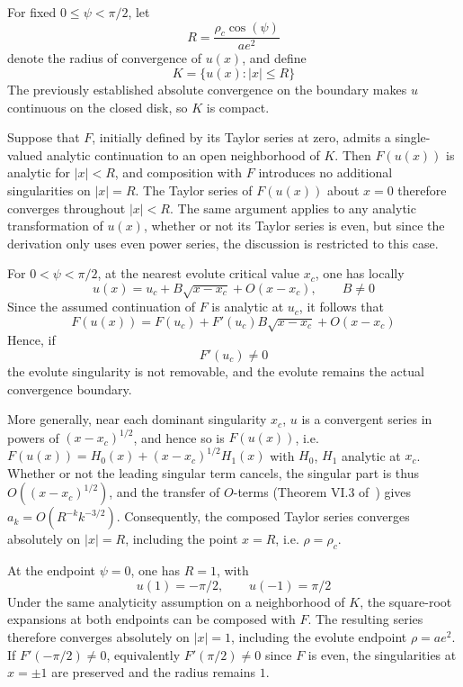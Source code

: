 \documentclass[a4paper]{amsart}
\begin{document}
For fixed $0\leq\psi<\pi/2$, let
\begin{equation*}
R=\frac{\rho_c\cos(\psi)}{ae^2}
\end{equation*}
denote the radius of convergence of $u(x)$, and define
\begin{equation*}
K=\{u(x):|x|\leq R\}
\end{equation*}
The previously established absolute convergence on the boundary makes $u$ continuous on the closed disk, so $K$ is compact.

Suppose that $F$, initially defined by its Taylor series at zero, admits a single-valued analytic continuation to an open neighborhood of $K$. Then $F(u(x))$ is analytic for $|x|<R$, and composition with $F$ introduces no additional singularities on $|x|=R$. The Taylor series of $F(u(x))$ about $x=0$ therefore converges throughout $|x|<R$. The same argument applies to any analytic transformation of $u(x)$, whether or not its Taylor series is even, but since the derivation only uses even power series, the discussion is restricted to this case.

For $0<\psi<\pi/2$, at the nearest evolute critical value $x_c$, one has locally
\begin{equation*}
u(x)=u_c+B\sqrt{x-x_c}+O(x-x_c),
\qquad B\neq0
\end{equation*}
Since the assumed continuation of $F$ is analytic at
$u_c$, it follows that
\begin{equation*}
F(u(x))
=
F(u_c)+F'(u_c)B\sqrt{x-x_c}+O(x-x_c)
\end{equation*}
Hence, if
\begin{equation*}
F'(u_c)\neq0
\end{equation*}
the evolute singularity is not removable, and the evolute remains the actual convergence boundary.

More generally, near each dominant singularity $x_c$, $u$ is a convergent series in powers of $(x-x_c)^{1/2}$, and hence so is $F(u(x))$, i.e. $F(u(x))=H_0(x)+(x-x_c)^{1/2}H_1(x)$ with $H_0$, $H_1$ analytic at $x_c$. Whether or not the leading singular term cancels, the singular part is thus $O((x-x_c)^{1/2})$, and the transfer of $O$-terms (Theorem VI.3 of~\cite{Flajolet2009}) gives $a_k=O(R^{-k}k^{-3/2})$. Consequently, the composed Taylor series converges absolutely on $|x|=R$, including the point $x=R$, i.e. $\rho=\rho_c$.

At the endpoint $\psi=0$, one has $R=1$, with
\begin{equation*}
u(1)=-\pi/2,\qquad u(-1)=\pi/2
\end{equation*}
Under the same analyticity assumption on a neighborhood of $K$, the square-root expansions at both endpoints can be composed with $F$. The resulting series therefore converges absolutely on $|x|=1$, including the evolute endpoint $\rho=ae^2$. If $F'(-\pi/2)\neq0$, equivalently $F'(\pi/2)\neq0$ since $F$ is even, the singularities at $x=\pm1$ are preserved and the radius remains $1$.
\end{document}
